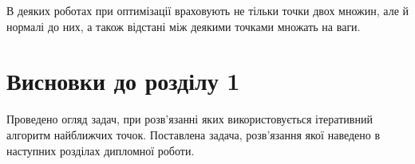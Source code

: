 В деяких роботах \cite{Hao:Li, nicp} при оптимізації враховують не тільки точки
двох множин, але й нормалі до них, а також відстані між деякими точками
множать на ваги.

\section*{Висновки до розділу 1}

Проведено огляд задач, при розв'язанні яких використовується ітеративний
алгоритм найближчих точок.
Поставлена задача, розв'язання якої наведено в наступних розділах
дипломної роботи.
